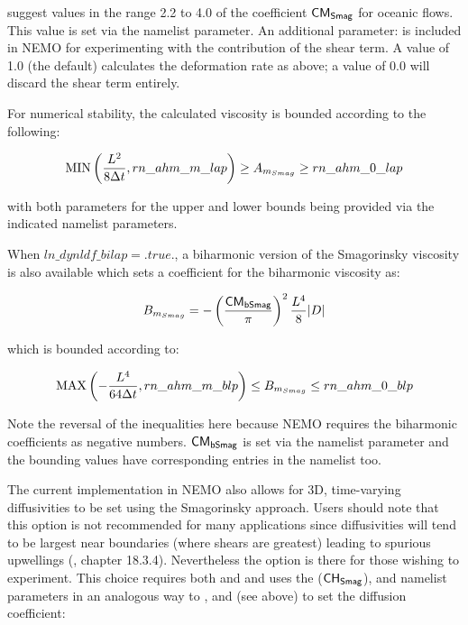 \documentclass[NEMO_book]{subfiles}
\begin{document}
\citep{Griffies_Hallberg_MWR00} suggest values in the range 2.2 to 4.0 of the coefficient
$\sf CM_{Smag}$ for oceanic flows. This value is set via the  namelist
parameter. An additional parameter:  is included in NEMO for experimenting
with the contribution of the shear term. A value of 1.0 (the default) calculates the
deformation rate as above; a value of 0.0 will discard the shear term entirely.

For numerical stability, the calculated viscosity is bounded according to the following:

\begin{equation}
{\rm MIN}\left ({ L^2\over {8\Delta{t}}}, rn\_ahm\_m\_lap\right ) \geq A_{m_{Smag}} 
                                                                  \geq rn\_ahm\_0\_lap
\end{equation}

\noindent with both parameters for the upper and lower bounds being provided via the
indicated namelist parameters.

\bigskip When $ln\_dynldf\_bilap = .true.$, a biharmonic version of the Smagorinsky
viscosity is also available which sets a coefficient for the biharmonic viscosity as:

\begin{equation}
B_{m_{Smag}} = - \left(\frac{{\sf CM_{bSmag}}}{\pi}\right)^2 {L^4\over 8}\vert{D}\vert
\end{equation}

\noindent which is bounded according to:

\begin{equation}
{\rm MAX}\left (-{ L^4\over {64\Delta{t}}}, rn\_ahm\_m\_blp\right ) \leq B_{m_{Smag}} 
                                                                    \leq rn\_ahm\_0\_blp
\end{equation}

\noindent Note the reversal of the inequalities here because NEMO requires the biharmonic
coefficients as negative numbers. $\sf CM_{bSmag}$ is set via the 
namelist parameter and the bounding values have corresponding entries in the namelist too.

\bigskip The current implementation in NEMO also allows for 3D, time-varying diffusivities
to be set using the Smagorinsky approach. Users should note that this option is not
recommended for many applications since diffusivities will tend to be largest near
boundaries (where shears are greatest) leading to spurious upwellings
(\citep{Griffies_Bk04}, chapter 18.3.4). Nevertheless the option is there for those
wishing to experiment. This choice requires both  and 
and uses the  (${\sf CH_{Smag}}$),  and 
namelist parameters in an analogous way to ,  and
 (see above) to set the diffusion coefficient:
\end{document}
